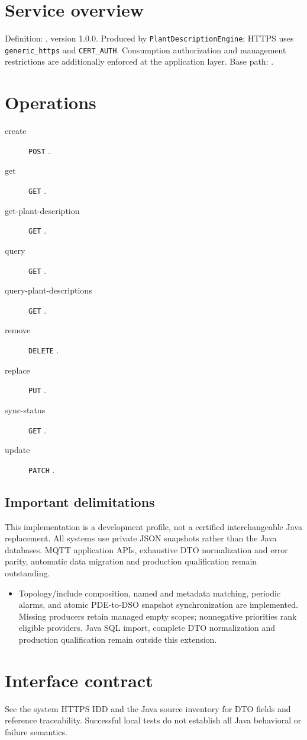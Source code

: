 \documentclass[a4paper]{arrowhead}
\begin{document}
\ArrowheadSetup
\section{Service overview}
Definition: , version 1.0.0. Produced by \texttt{PlantDescriptionEngine}; HTTPS uses \texttt{generic\_https} and \texttt{CERT\_AUTH}. Consumption authorization and management restrictions are additionally enforced at the application layer. Base path: .
\section{Operations}
\begin{description}
\item[create] \texttt{POST} .
\item[get] \texttt{GET} .
\item[get-plant-description] \texttt{GET} .
\item[query] \texttt{GET} .
\item[query-plant-descriptions] \texttt{GET} .
\item[remove] \texttt{DELETE} .
\item[replace] \texttt{PUT} .
\item[sync-status] \texttt{GET} .
\item[update] \texttt{PATCH} .
\end{description}
\subsection{Important delimitations}
This implementation is a development profile, not a certified interchangeable Java replacement. All systems use private JSON snapshots rather than the Java databases. MQTT application APIs, exhaustive DTO normalization and error parity, automatic data migration and production qualification remain outstanding.
\begin{itemize}
\item Topology/include composition, named and metadata matching, periodic alarms, and atomic PDE-to-DSO snapshot synchronization are implemented. Missing producers retain managed empty scopes; nonnegative priorities rank eligible providers. Java SQL import, complete DTO normalization and production qualification remain outside this extension.
\end{itemize}
\section{Interface contract}
See the system HTTPS IDD and the Java source inventory for DTO fields and reference traceability. Successful local tests do not establish all Java behavioral or failure semantics.
\end{document}

